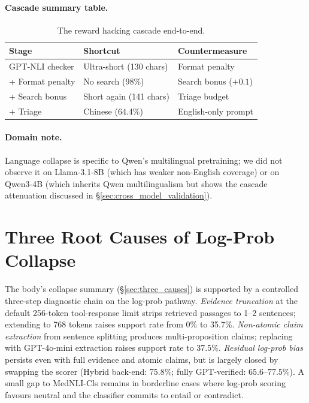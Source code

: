 \documentclass[11pt]{article}
\begin{document}
\paragraph{Cascade summary table.}
\begin{table}[h]
\centering\small
\begin{tabular}{p{2.6cm}p{2.0cm}p{2.4cm}}
\toprule
\textbf{Stage} & \textbf{Shortcut} & \textbf{Countermeasure} \\
\midrule
GPT-NLI checker & Ultra-short (130 chars) & Format penalty \\
+ Format penalty & No search (98\%) & Search bonus ($+0.1$) \\
+ Search bonus & Short again (141 chars) & Triage budget \\
+ Triage & Chinese (64.4\%) & English-only prompt \\
\bottomrule
\end{tabular}
\caption{The reward hacking cascade end-to-end.}
\label{tab:cascade}
\end{table}

\paragraph{Domain note.}
Language collapse is specific to Qwen's multilingual
pretraining; we did not observe it on Llama-3.1-8B
(which has weaker non-English coverage) or on
Qwen3-4B (which inherits Qwen multilingualism but
shows the cascade attenuation discussed in
\S\ref{sec:cross_model_validation}).



\section{Three Root Causes of Log-Prob Collapse}
\label{app:three_causes}

The body's collapse summary (\S\ref{sec:three_causes})
is supported by a controlled three-step diagnostic
chain on the log-prob pathway.
\textit{Evidence truncation} at the default 256-token
tool-response limit strips retrieved passages to 1--2
sentences; extending to 768 tokens raises support rate
from 0\% to 35.7\%.
\textit{Non-atomic claim extraction} from sentence
splitting produces multi-proposition claims; replacing
with GPT-4o-mini extraction raises support rate to 37.5\%.
\textit{Residual log-prob bias} persists even with full
evidence and atomic claims, but is largely closed by
swapping the scorer (Hybrid back-end: 75.8\%; fully
GPT-verified: 65.6--77.5\%). A small gap to MedNLI-Cls
remains in borderline cases where log-prob scoring
favours neutral and the classifier commits to entail
or contradict.
\end{document}
